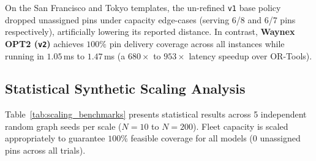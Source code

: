 \documentclass[10pt,journal,compsoc]{IEEEtran}
\begin{document}
On the San Francisco and Tokyo templates, the un-refined \texttt{v1} base policy dropped unassigned pins under capacity edge-cases (serving 6/8 and 6/7 pins respectively), artificially lowering its reported distance. In contrast, \textbf{Waynex OPT2 (\texttt{v2})} achieves $100\%$ pin delivery coverage across all instances while running in $1.05$\,ms to $1.47$\,ms (a $680\times$ to $953\times$ latency speedup over OR-Tools).

\subsection{Statistical Synthetic Scaling Analysis}
Table~\ref{tab:scaling_benchmarks} presents statistical results across 5 independent random graph seeds per scale ($N=10$ to $N=200$). Fleet capacity is scaled appropriately to guarantee $100\%$ feasible coverage for all models ($0$ unassigned pins across all trials).

\begin{table}[h]
\centering
\caption{Statistical Scaling Benchmarks (Mean $\pm$ Std Over 5 Random Seeds)}
\label{tab:scaling_benchmarks}
\end{table}
\end{document}
